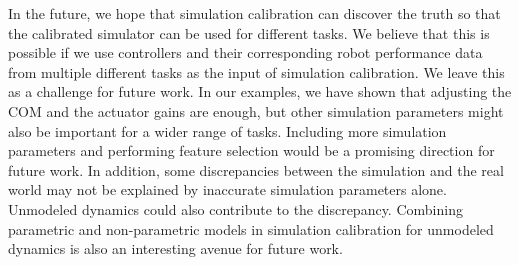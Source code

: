  In the future, we hope that simulation calibration can discover the truth so that the calibrated simulator can be used for different tasks. We believe that this is possible if we use controllers and their corresponding robot performance data from multiple different tasks as the input of simulation calibration. We leave this as a challenge for future work. In our examples, we have shown that adjusting the COM and the actuator gains are enough, but other simulation parameters might also be important for a wider range of tasks. Including more simulation parameters and performing feature selection would be a promising direction for future work. In addition, some discrepancies between the simulation and the real world may not be explained by inaccurate simulation parameters alone. Unmodeled dynamics could also contribute to the discrepancy. Combining parametric and non-parametric models in simulation calibration for unmodeled dynamics is also an interesting avenue for future work.


